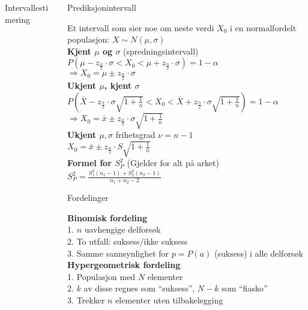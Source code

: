 \documentclass[final,hyperref={pdfpagelabels=false}]{beamer}
\begin{document}
\begin{frame}{}
\begin{columns}[t]
\begin{column}{.25\linewidth}
\begin{block}{\center Intervallestimering}
			\end{block}
		\end{column}
		\begin{column}{.25\linewidth}
			\begin{block}{}
				\center\normalsize Prediksjonintervall\\
				{\footnotesize\raggedright
					Et intervall som sier noe om neste verdi $X_0$ i en normalfordelt populasjon: $X\sim N(\mu,\sigma)$\\
					\textbf{Kjent $\mu$ og $\sigma$} (spredningsintervall)\\
					$P\left( \mu - z_\frac{\alpha}{2} \cdot \sigma < X_0 < \mu + z_\frac{\alpha}{2} \cdot \sigma \right)=1-\alpha$\\
					$\Rightarrow X_0=\mu \pm z_\frac{\alpha}{2}\cdot \sigma$\\
					\textbf{Ukjent $\mu$, kjent $\sigma$} \\
					$P\left( \bar X - z_\frac{\alpha}{2} \cdot \sigma \sqrt{1 + \frac{1}{n}} < X_0 < \bar X + z_\frac{\alpha}{2} \cdot \sigma \sqrt{1 + \frac{1}{n}} \right)=1-\alpha$\\
					$\Rightarrow X_0=\bar x \pm z_\frac{\alpha}{2}\cdot \sigma \sqrt{1 + \frac{1}{n}}$\\
					\textbf{Ukjent $\mu, \sigma$} frihetsgrad $\nu=n-1$\\
					$X_0=\bar x \pm z_\frac{\alpha}{2} \cdot S\sqrt{1 + \frac{1}{n}}$ \\
					\textbf{Formel for $S_P^2$} (Gjelder for alt på arket) \\
					$S_P^2=\frac{S_1^2(n_1-1)+S_2^2(n_2-1)}{n_1 + n_2 - 2}$
				}
			\end{block}
			\begin{block}{\center\normalsize Fordelinger}
				{\footnotesize\raggedright
					\textbf{Binomisk fordeling}\\
					1. $n$ uavhengige delforsøk\\
					2. To utfall: suksess/ikke suksess\\
					3. Samme sannsynlighet for $p=P(a)$ (suksess) i alle delforsøk\\
					\textbf{Hypergeometrisk fordeling}\\
					1. Populasjon med $N$ elementer\\
					2. $k$ av disse regnes som ``suksess'', $N-k$ som ``fiasko''\\
					3. Trekker $n$ elementer uten tilbakelegging\\
}
\end{block}
\end{column}
\end{columns}
\end{frame}
\end{document}

